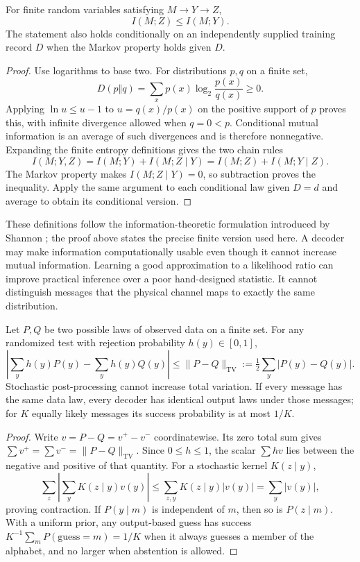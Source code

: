 \begin{theorem}
\label{thm:cc-dpi}
For finite random variables satisfying $M\to Y\to Z$,
\[
 I(M;Z)\le I(M;Y).
\]
The statement also holds conditionally on an independently supplied
training record $D$ when the Markov property holds given $D$.
\end{theorem}

\begin{proof}
Use logarithms to base two. For distributions $p,q$ on a finite set,
\[
 D(p\Vert q)=\sum_xp(x)\log_2\frac{p(x)}{q(x)}\ge0.
\]
Applying
$\ln u\le u-1$ to $u=q(x)/p(x)$ on the positive support of $p$ proves
this, with infinite divergence allowed when $q=0<p$.
Conditional mutual information is an average of such divergences and
is therefore nonnegative. Expanding the finite entropy definitions gives
the two chain rules
\[
 I(M;Y,Z)=I(M;Y)+I(M;Z\mid Y)
        =I(M;Z)+I(M;Y\mid Z).
\]
The Markov property makes $I(M;Z\mid Y)=0$, so subtraction proves the
inequality. Apply the same argument to each conditional law given $D=d$
and average to obtain its conditional version.
\end{proof}

These definitions follow the information-theoretic formulation introduced
by Shannon \citep{CCShannon1948}; the proof above states the precise finite
version used here. A decoder may make information computationally usable
even though it cannot increase mutual information. Learning a good
approximation to a likelihood ratio can improve practical inference over
a poor hand-designed statistic. It cannot distinguish messages that the
physical channel maps to exactly the same distribution.

\begin{proposition}
\label{prop:cc-identifiability}
Let $P,Q$ be two possible laws of observed data on a finite set. For any
randomized test with rejection probability $h(y)\in[0,1]$,
\[
 \left|\sum_yh(y)P(y)-\sum_yh(y)Q(y)\right|
 \le \|P-Q\|_{\mathrm{TV}}
 :=\tfrac12\sum_y|P(y)-Q(y)|.
\]
Stochastic post-processing cannot increase total variation. If every
message has the same data law, every decoder has identical output laws
under those messages; for $K$ equally likely messages its success
probability is at most $1/K$.
\end{proposition}

\begin{proof}
Write $v=P-Q=v^+-v^-$ coordinatewise. Its zero total sum gives
$\sum v^+=\sum v^-=\|P-Q\|_{\mathrm{TV}}$. Since $0\le h\le1$, the
scalar $\sum hv$ lies between the negative and positive of that quantity.
For a stochastic kernel $K(z\mid y)$,
\[
 \sum_z\left|\sum_yK(z\mid y)v(y)\right|
 \le\sum_{z,y}K(z\mid y)|v(y)|=\sum_y|v(y)|,
\]
proving contraction. If $P(y\mid m)$ is independent of $m$, then so is
$P(z\mid m)$. With a uniform prior, any output-based guess has success
$K^{-1}\sum_mP(\text{guess}=m)=1/K$ when it always guesses a member of
the alphabet, and no larger when abstention is allowed.
\end{proof}

